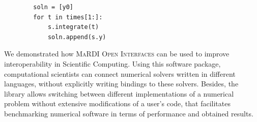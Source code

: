 \documentclass[a0paper, twocolumn, csc, english, final]{mpi2015_poster}
\newcommand{\OIF}{\textsc{MaRDI Open Interfaces}\xspace}
\begin{document}
\begin{poster}
\begin{pcolumn}
\begin{pbox}
\begin{verbatim}
        soln = [y0]
        for t in times[1:]:
            s.integrate(t)
            soln.append(s.y)
      \end{verbatim}
    \end{pbox}
    \begin{pbox}
      \large
      We demonstrated how \OIF{} can be used to improve
      interoperability in Scientific Computing.
      Using this software package, computational scientists can connect numerical
      solvers written in different languages, without explicitly writing bindings
      to these solvers.
      Besides, the library allows switching between different implementations
      of a numerical problem without extensive modifications of a user's code,
      that facilitates benchmarking numerical software in terms of performance
      and obtained results.
    \end{pbox}
    \begin{pbox}
      \vspace{1em}
      \printbibliography[]
    \end{pbox}
  \end{pcolumn}
\end{poster}
\end{document}
